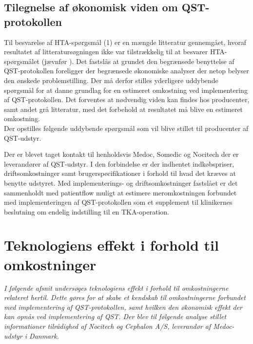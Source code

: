 \subsection{Tilegnelse af økonomisk viden om QST-protokollen}
Til besvarelse af HTA-spørgsmål (1) er en mængde litteratur gennemgået, hvoraf resultatet af litteratursøgningen ikke var tilstrækkelig til at besvarer HTA-spørgsmålet (jævnfør ). Det fastslås at grundet den begrænsede benyttelse af QST-protokollen foreligger der begrænsede økonomiske analyser der netop belyser den ønskede problemstilling. Der må derfor stilles yderligere uddybende spørgsmål for at danne grundlag for en estimeret omkostning ved implementering af QST-protokollen. Det forventes at nødvendig viden kan findes hos producenter, samt andet grå litteratur, med det forbehold at resultatet må blive en estimeret omkostning.\\ 
Der opstilles følgende uddybende spørgsmål som vil blive stillet til producenter af QST-udstyr.


Der er blevet taget kontakt til henholdsvis Medoc, Somedic og Nocitech der er leverandører af QST-udstyr. I den forbindelse er der indhentet indkøbspriser, driftsomkostninger samt brugerspecifikationer i forhold til hvad det kræves at benytte udstyret. Med implementerings- og driftsomkostninger fastslået er det sammenholdt med patientflow muligt at estimere meromkostningen forbundet med implementeringen af QST-protokollen som et supplement til klinikernes beslutning om endelig indstilling til en TKA-operation. 

\section{Teknologiens effekt i forhold til omkostninger} \label{priser}
\textit{I følgende afsnit undersøges teknologiens effekt i forhold til omkostningerne relateret hertil. Dette gøres for at skabe et kendskab til omkostningerne forbundet med implementering af QST-protokollen, samt hvilken den økonomisk effekt der kan opnås ved implementering af QST. Der blev til følgende analyse stillet informationer tilrådighed af Nocitech og Cephalon A/S, leverandør af Medoc-udstyr i Danmark.}

